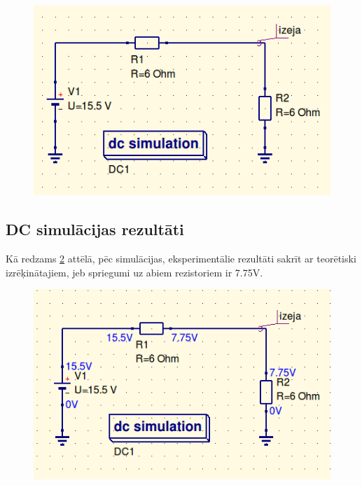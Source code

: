 \documentclass{report}
\begin{document}
\begin{figure}[b!]
\centering
\includegraphics[scale=0.79]{prshema.png}
\label{att:4}
\end{figure}

\subsection{DC simulācijas rezultāti}
Kā redzams \ref{att:5} attēlā, pēc simulācijas, eksperimentālie rezultāti sakrīt ar teorētiski izrēķinātajiem, jeb spriegumi uz abiem rezistoriem ir 7.75V.

\begin{figure}[b!]
\centering
\includegraphics[scale=0.65]{dcsim.png}
\label{att:5}
\end{figure}
\end{document}
